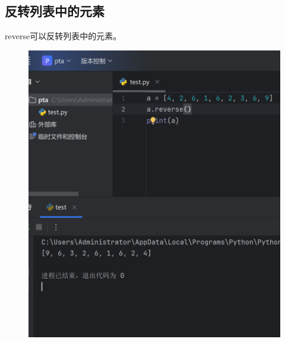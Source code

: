 \documentclass{article}
\begin{document}
\newpage
\subsection{反转列表中的元素}
reverse可以反转列表中的元素。
\begin{figure}[H]
    \centering
    \includegraphics[width=1\linewidth]{reverse.png}
\end{figure}


\newpage
\end{document}
